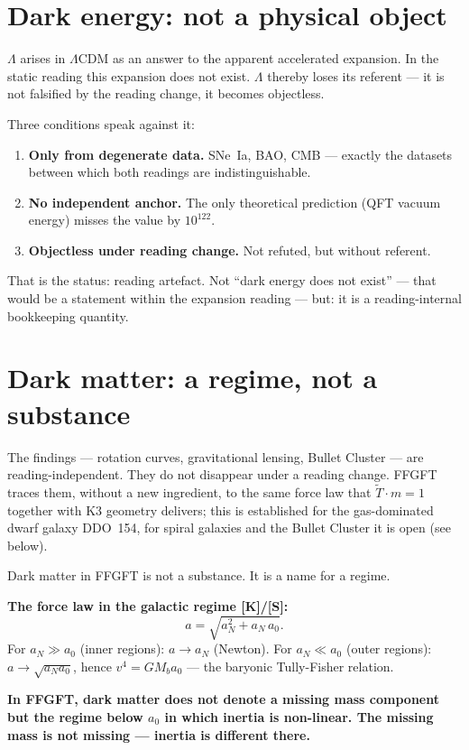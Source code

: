 \section{Dark energy: not a physical object}

$\Lambda$ arises in $\Lambda$CDM as an answer to the apparent accelerated
expansion. In the static reading this expansion does not exist. $\Lambda$
thereby loses its referent — it is not falsified by the reading change,
it becomes objectless.

Three conditions speak against it:

\begin{enumerate}
  \item \textbf{Only from degenerate data.} SNe~Ia, BAO, CMB — exactly
        the datasets between which both readings are indistinguishable.
  \item \textbf{No independent anchor.} The only theoretical prediction
        (QFT vacuum energy) misses the value by $10^{122}$.
  \item \textbf{Objectless under reading change.} Not refuted, but
        without referent.
\end{enumerate}

That is the status: reading artefact. Not ``dark energy does not exist''
— that would be a statement within the expansion reading — but: it is a
reading-internal bookkeeping quantity.

\section{Dark matter: a regime, not a substance}

The findings — rotation curves, gravitational lensing, Bullet Cluster —
are reading-independent. They do not disappear under a reading change.
FFGFT traces them, without a new ingredient, to the same force law
that $\tilde T \cdot m = 1$ together with K3 geometry delivers; this is
established for the gas-dominated dwarf galaxy DDO~154, for spiral galaxies
and the Bullet Cluster it is open (see below).

Dark matter in FFGFT is not a substance.
It is a name for a regime.

\textbf{The force law in the galactic regime [K]/[S]:}
\[
  a = \sqrt{a_N^2 + a_N\,a_0} .
\]
For $a_N \gg a_0$ (inner regions): $a \to a_N$ (Newton).
For $a_N \ll a_0$ (outer regions): $a \to \sqrt{a_N a_0}$,
hence $v^4 = G M_b a_0$ — the baryonic Tully-Fisher relation.

\textbf{In FFGFT, dark matter does not denote a missing mass component
but the regime below $a_0$ in which inertia is non-linear. The missing
mass is not missing — inertia is different there.}

